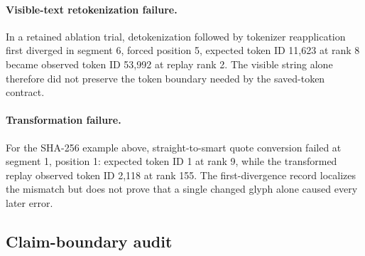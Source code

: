 \documentclass[fleqn,10pt]{wlscirep}
\begin{document}
\paragraph{Visible-text retokenization failure.}
In a retained ablation trial, detokenization followed by tokenizer reapplication first diverged in segment 6, forced position 5, expected token ID 11,623 at rank 8 became observed token ID 53,992 at replay rank 2. The visible string alone therefore did not preserve the token boundary needed by the saved-token contract.

\paragraph{Transformation failure.}
For the SHA-256 example above, straight-to-smart quote conversion failed at segment 1, position 1: expected token ID 1 at rank 9, while the transformed replay observed token ID 2,118 at rank 155. The first-divergence record localizes the mismatch but does not prove that a single changed glyph alone caused every later error.

\subsection*{Claim-boundary audit}
\end{document}

